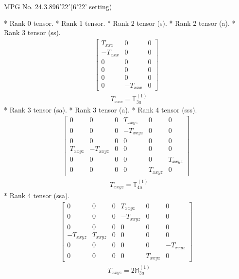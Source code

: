 \documentclass[fleqn,8pt,landscape]{jsarticle}
\begin{document}
\setcounter{MaxMatrixCols}{32}

\renewcommand{\tablename}{Table~}
\renewcommand{\figurename}{Figure~}
\begin{center}
\LARGE
MPG No. 24.3.89\quad$6'22'$\quad(6'22' setting)
\end{center}
* Rank 0 tensor.
* Rank 1 tensor.
* Rank 2 tensor (s).
* Rank 2 tensor (a).
* Rank 3 tensor (ss).
\begin{align*}
\begin{bmatrix} T_{xxx} & 0 & 0 \\ - T_{xxx} & 0 & 0 \\ 0 & 0 & 0 \\ 0 & 0 & 0 \\ 0 & 0 & 0 \\ 0 & - T_{xxx} & 0 \end{bmatrix}
\end{align*}
\begin{align*}
& T_{xxx} = \mathbb{T}_{3a}^{(1)}
\end{align*}
* Rank 3 tensor (sa).
* Rank 3 tensor (a).
* Rank 4 tensor (sss).
\begin{align*}
\begin{bmatrix} 0 & 0 & 0 & T_{xxyz} & 0 & 0 \\ 0 & 0 & 0 & - T_{xxyz} & 0 & 0 \\ 0 & 0 & 0 & 0 & 0 & 0 \\ T_{xxyz} & - T_{xxyz} & 0 & 0 & 0 & 0 \\ 0 & 0 & 0 & 0 & 0 & T_{xxyz} \\ 0 & 0 & 0 & 0 & T_{xxyz} & 0 \end{bmatrix}
\end{align*}
\begin{align*}
& T_{xxyz} = \mathbb{T}_{4a}^{(1)}
\end{align*}
* Rank 4 tensor (ssa).
\begin{align*}
\begin{bmatrix} 0 & 0 & 0 & T_{xxyz} & 0 & 0 \\ 0 & 0 & 0 & - T_{xxyz} & 0 & 0 \\ 0 & 0 & 0 & 0 & 0 & 0 \\ - T_{xxyz} & T_{xxyz} & 0 & 0 & 0 & 0 \\ 0 & 0 & 0 & 0 & 0 & - T_{xxyz} \\ 0 & 0 & 0 & 0 & T_{xxyz} & 0 \end{bmatrix}
\end{align*}
\begin{align*}
& T_{xxyz} = 2 \mathbb{M}_{3a}^{(1)}
\end{align*}
\end{document}
